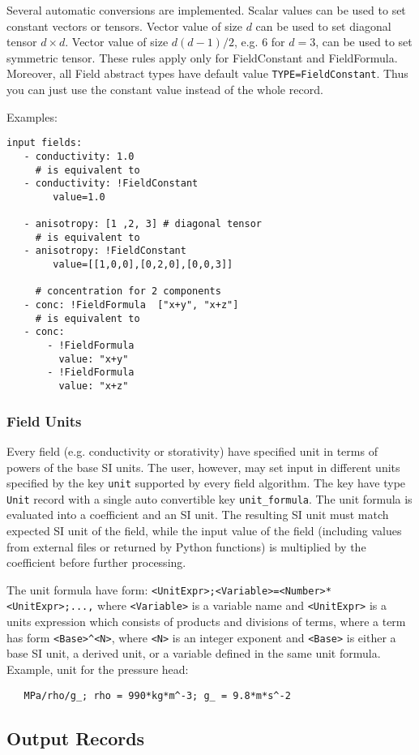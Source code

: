 Several automatic conversions are implemented. Scalar values can be used to set constant vectors or tensors. Vector value of size $d$ can be used to set diagonal tensor $d\times d$.
Vector value of size $d(d-1)/2$, e.g. $6$ for $d=3$, can be used to set symmetric tensor. These rules apply only for FieldConstant and FieldFormula.
Moreover, all Field abstract types have default value \verb'TYPE=FieldConstant'. Thus you can just use the constant value instead of the whole record.

Examples:
\begin{verbatim}
input fields:
   - conductivity: 1.0
     # is equivalent to
   - conductivity: !FieldConstant
        value=1.0
   
   - anisotropy: [1 ,2, 3] # diagonal tensor
     # is equivalent to
   - anisotropy: !FieldConstant
        value=[[1,0,0],[0,2,0],[0,0,3]]

     # concentration for 2 components   
   - conc: !FieldFormula  ["x+y", "x+z"]
     # is equivalent to
   - conc: 
       - !FieldFormula
         value: "x+y"
       - !FieldFormula
         value: "x+z"
\end{verbatim}

\subsubsection{Field Units}
Every field (e.g. conductivity or storativity) have specified unit in terms of powers of the base SI units. 
The user, however, may set input in different units specified by the key \verb'unit' 
supported by every field algorithm. The key have type \verb'Unit' record with a single auto convertible key 
\verb'unit_formula'. The unit formula is evaluated  into a coefficient and an SI unit. The resulting SI unit 
must match expected SI unit of the field, while the input value 
of the field (including values from external files or returned by Python functions)  
is multiplied by the coefficient before further processing.

The unit formula have form: {\tt <UnitExpr>;<Variable>=<Number>*<UnitExpr>;...,}
where {\tt <Variable>} is a variable name and {\tt <UnitExpr>} is a units expression
which consists of products and divisions of terms, where a term has form \verb'<Base>^<N>', 
where {\tt <N>} is an integer exponent and {\tt <Base>} is either a base SI unit, 
a derived unit, or a variable defined in the same unit formula.
Example, unit for the pressure head: 
\begin{verbatim}
   MPa/rho/g_; rho = 990*kg*m^-3; g_ = 9.8*m*s^-2
\end{verbatim}


\subsection{Output Records}
